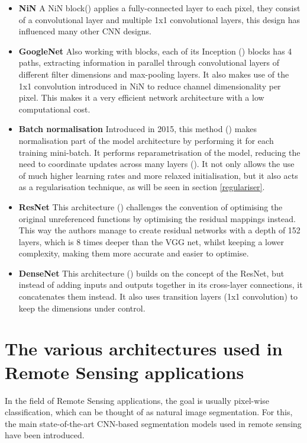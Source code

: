 \begin{itemize}

    \item \textbf{\gls{NiN}}  A \gls{NiN} block(\cite{lin2014network}) applies a fully-connected layer to each pixel, they consist of a convolutional layer and multiple 1x1 convolutional layers, this design has influenced many other \gls{CNN} designs.
 
    \item \textbf{GoogleNet } Also working with blocks, each of its Inception (\cite{7298594}) blocks has 4 paths, extracting information in parallel through convolutional layers of different filter dimensions and max-pooling layers. It also makes use of the 1x1 convolution introduced in \gls{NiN} to reduce channel dimensionality per pixel. This makes it a very efficient network architecture with a low computational cost.
    
    \item \textbf{Batch normalisation} Introduced in 2015, this method (\cite{ioffe2015batch}) makes normalisation part of the model architecture by performing it for each training mini-batch. It performs reparametrisation of the model, reducing the need to coordinate updates across many layers (\cite{GoodBengCour16}). It not only allows the use of much higher learning rates and more relaxed initialisation, but it also acts as a regularisation technique, as will be seen in section \ref{regulariser}.
    
    \item \textbf{ResNet} This architecture (\cite{he2015deep}) challenges the convention of optimising the original unreferenced functions by optimising the residual mappings instead. This way the authors manage to create residual networks with a depth of 152 layers, which is $8$ times deeper than the VGG net, whilst keeping a lower complexity, making them more accurate and easier to optimise. 
    \item \textbf{DenseNet} This architecture (\cite{8099726}) builds on the concept of the ResNet, but instead of adding inputs and outputs together in its cross-layer connections, it concatenates them instead. It also uses transition layers (1x1 convolution) to keep the dimensions under control.

\end{itemize}

\section{The various architectures used in Remote Sensing applications} \label{seg_nets}
In the field of Remote Sensing applications, the goal is usually pixel-wise classification, which can be thought of as natural image segmentation. For this, the main state-of-the-art \gls{CNN}-based segmentation models used in remote sensing have been introduced.

